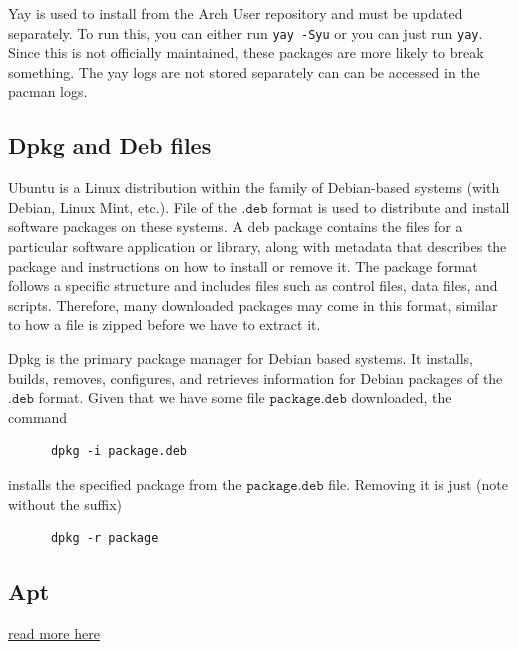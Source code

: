 \documentclass{article}
\begin{document}
    Yay is used to install from the Arch User repository and must be updated separately. To run this, you can either run \texttt{yay -Syu} or you can just run \texttt{yay}. Since this is not officially maintained, these packages are more likely to break something. The yay logs are not stored separately can can be accessed in the pacman logs. 

  \subsection{Dpkg and Deb files}

    Ubuntu is a Linux distribution within the family of Debian-based systems (with Debian, Linux Mint, etc.). File of the $\texttt{.deb}$ format is used to distribute and install software packages on these systems. A deb package contains the files for a particular software application or library, along with metadata that describes the package and instructions on how to install or remove it. The package format follows a specific structure and includes files such as control files, data files, and scripts. Therefore, many downloaded packages may come in this format, similar to how a file is zipped before we have to extract it. 

    Dpkg is the primary package manager for Debian based systems. It installs, builds, removes, configures, and retrieves information for Debian packages of the $\texttt{.deb}$ format. Given that we have some file $\texttt{package.deb}$ downloaded, the command 
    \begin{lstlisting}
      dpkg -i package.deb
    \end{lstlisting}
    installs the specified package from the $\texttt{package.deb}$ file. Removing it is just (note without the suffix) 
    \begin{lstlisting}
      dpkg -r package
    \end{lstlisting}

  \subsection{Apt}

    \href{https://www.reddit.com/r/Ubuntu/comments/9awvip/eli5_snap_and_flatpak_how_are_they_differ_from_apt/}{read more here}
\end{document}
